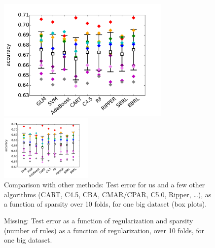 \begin{figure}[t!]
\begin{center}
\begin{arxiv}
\includegraphics[width=0.75\textwidth]{figs/compare-compas.pdf}
\end{arxiv}
\begin{kdd}
\includegraphics[width=0.4\textwidth]{figs/compare-compas.pdf}
\end{kdd}
\end{center}
\caption{Comparison with other methods:
Test error for us and a few other algorithms
(CART, C4.5, CBA, CMAR/CPAR, C5.0, Ripper, \dots),
as a function of sparsity over 10 folds, for one big dataset (box plots).}
\label{fig:comparison}
\end{figure}

\begin{arxiv}
\begin{figure}[t!]
\begin{center}
\end{center}
\caption{Missing:  Test error as a function of regularization and sparsity
(number of rules) as a function of regularization, over 10 folds,
for one big dataset.}
\label{fig:regularization}
\end{figure}
\end{arxiv}

